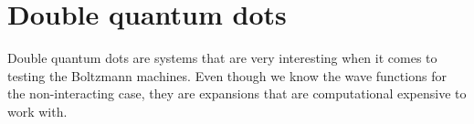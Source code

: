 \iffalse
\section{Double quantum dots}
Double quantum dots are systems that are very interesting when it comes to testing the Boltzmann machines. Even though we know the wave functions for the non-interacting case, they are expansions that are computational expensive to work with.

